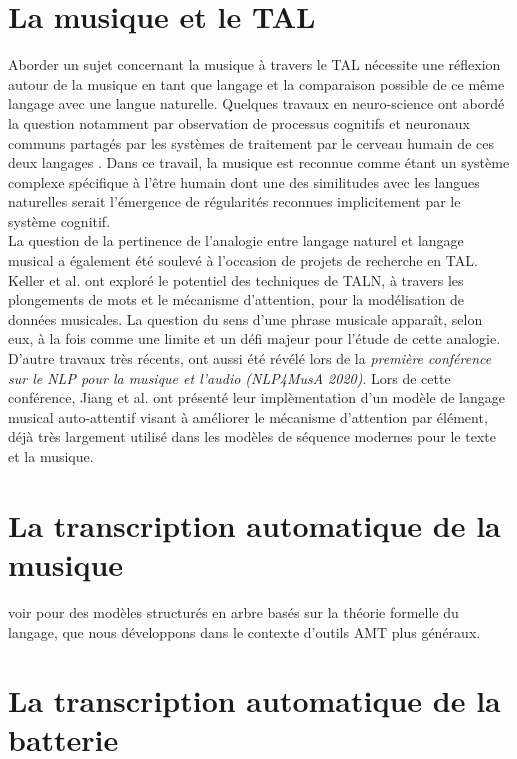 \section{La musique et le TAL}
Aborder un sujet concernant la musique à travers le TAL nécessite une réflexion autour de la musique en tant que langage et la comparaison possible de ce même langage avec une langue naturelle. Quelques travaux en neuro-science ont abordé la question notamment par observation de processus cognitifs et neuronaux communs partagés par les systèmes de traitement par le cerveau humain de ces deux langages \cite{poulincharronnat:hal-01985213}. Dans ce travail, la musique est reconnue comme étant un système complexe spécifique à l’être humain dont une des similitudes avec les langues naturelles serait l’émergence de régularités reconnues implicitement par le système cognitif.\\
La question de la pertinence de l’analogie entre langage naturel et langage musical a également été soulevé à l’occasion de projets de recherche en TAL. Keller et al. \cite{keller:hal-03279850} ont exploré le potentiel des techniques de TALN, à travers les plongements de mots et le mécanisme d’attention, pour la modélisation de données musicales. La question du sens d’une phrase musicale apparaît, selon eux, à la fois comme une limite et un défi majeur pour l’étude de cette analogie.\\
D’autre travaux très récents, ont aussi été révélé lors de la \textit{première conférence sur le NLP pour la musique et l'audio (NLP4MusA 2020)}. Lors de cette conférence, Jiang et al. \cite{Jiang2020DiscoveringMR} ont présenté leur implèmentation d’un modèle de langage musical auto-attentif visant à améliorer le mécanisme d'attention par élément, déjà très largement utilisé dans les modèles de séquence modernes pour le texte et la musique.
\section{La transcription automatique de la musique}
\cite{article1}
\cite{article2}
voir \cite{foscarin:hal-01988990} pour des modèles structurés en arbre basés sur la théorie formelle du langage, que nous développons dans le contexte d'outils AMT plus généraux.
\section{La transcription automatique de la batterie}

